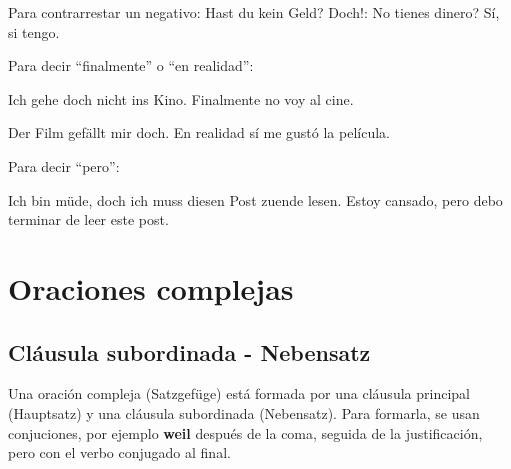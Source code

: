 Para contrarrestar un negativo:
Hast du kein Geld? Doch!: No tienes dinero? Sí, si tengo.

Para decir ``finalmente'' o ``en realidad'':
\begin{myitemize}
\item Ich gehe doch nicht ins Kino. Finalmente no voy al cine.
\item Der Film gefällt mir doch. En realidad sí me gustó la película.
\end{myitemize}

Para decir ``pero'':
\begin{myitemize}
\item Ich bin müde, doch ich muss diesen Post zuende lesen. Estoy cansado, pero debo terminar de leer este post.
\end{myitemize}


\section{Oraciones complejas}
\subsection{Cláusula subordinada - Nebensatz}
Una oración compleja (Satzgefüge) está formada por una cláusula principal (Hauptsatz) y una cláusula subordinada (Nebensatz). Para formarla, se usan conjuciones, por ejemplo \textbf{weil} después de la coma, seguida de la justificación, pero con el verbo conjugado al final.

